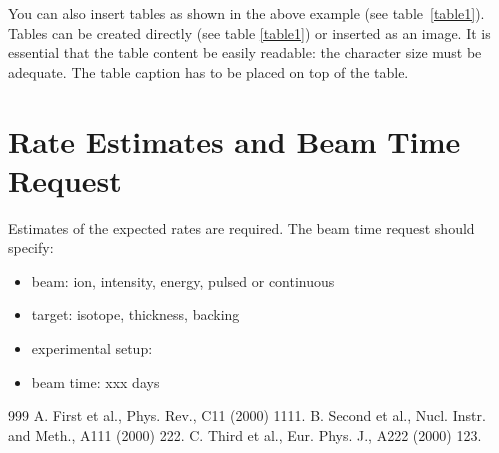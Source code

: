 \documentclass[a4paper,12pt,tightenlines]{revtex4}
\begin{document}
You can also insert tables as shown in the above example (see table~\ref{table1}). Tables 
can be created directly (see table \ref{table1}) or inserted as an image. It is essential 
that the table content be easily 
readable: the character size must be adequate. The table caption has to be placed on top 
of the table. 

\section{Rate Estimates and Beam Time Request}

Estimates of the expected rates are required. The beam time request should specify: 
\begin{itemize}
\item beam: ion, intensity, energy, pulsed or continuous
\item target: isotope, thickness, backing
\item experimental setup:
\item beam time: xxx days
\end{itemize}

\begin{thebibliography}{999} 
 A. First et al., Phys. Rev., C11 (2000) 1111.
 B. Second et al., Nucl. Instr. and Meth., A111 (2000) 222.
 C. Third et al., Eur. Phys. J., A222 (2000) 123.
\end{thebibliography}
\end{document}
